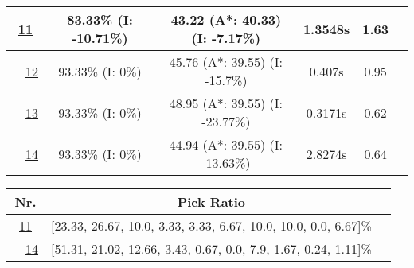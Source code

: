 \begin{table}[]
\begin{tabular}{|cc|c|c|c|c|c|}
\hline
\hline
\multicolumn{2}{|c|}{\cellcolor{orange!40} \hyperref[tab: evalalgorithms]{11}} & 83.33\% (I: -10.71\%) & 43.22 (A*: 40.33) (I: -7.17\%) & 1.3548s & 1.63\\
\hline
\hline
\multicolumn{1}{|M{0.15cm}}{\cellcolor{cyan!40}} & \multicolumn{1}{M{0.15cm}|}{\cellcolor{blue!40} \hspace*{-0.5cm}\hyperref[tab: evalalgorithms]{12}} & 93.33\% (I: 0\%) & 45.76 (A*: 39.55) (I: -15.7\%) & 0.407s & 0.95\\
\hline
\multicolumn{1}{|M{0.15cm}}{\cellcolor{cyan!40}} & \multicolumn{1}{M{0.15cm}|}{\cellcolor{red!40} \hspace*{-0.5cm}\hyperref[tab: evalalgorithms]{13}} & 93.33\% (I: 0\%) & 48.95 (A*: 39.55) (I: -23.77\%) & 0.3171s & 0.62\\
\hline
\multicolumn{1}{|M{0.15cm}}{\cellcolor{cyan!40}} & \multicolumn{1}{M{0.15cm}|}{\cellcolor{orange!40} \hspace*{-0.5cm}\hyperref[tab: evalalgorithms]{14}} & 93.33\% (I: 0\%) & 44.94 (A*: 39.55) (I: -13.63\%) & 2.8274s & 0.64\\
\hline
\end{tabular}


\bigskip

\begin{tabular}{|cc|c|c|}
\hline
\multicolumn{2}{|c|}{\textbf{Nr.}} & \textbf{Pick Ratio}\\
\hline
\hline
\multicolumn{2}{|c|}{\cellcolor{orange!40} \hyperref[tab: evalalgorithms]{11}} & [23.33, 26.67, 10.0, 3.33, 3.33, 6.67, 10.0, 10.0, 0.0, 6.67]\%\\
\hline
\hline
\multicolumn{1}{|M{0.15cm}}{\cellcolor{cyan!40}} & \multicolumn{1}{M{0.15cm}|}{\cellcolor{orange!40} \hspace*{-0.5cm}\hyperref[tab: evalalgorithms]{14}} & [51.31, 21.02, 12.66, 3.43, 0.67, 0.0, 7.9, 1.67, 0.24, 1.11]\%\\
\hline
\end{tabular}


\bigskip


\end{table}
